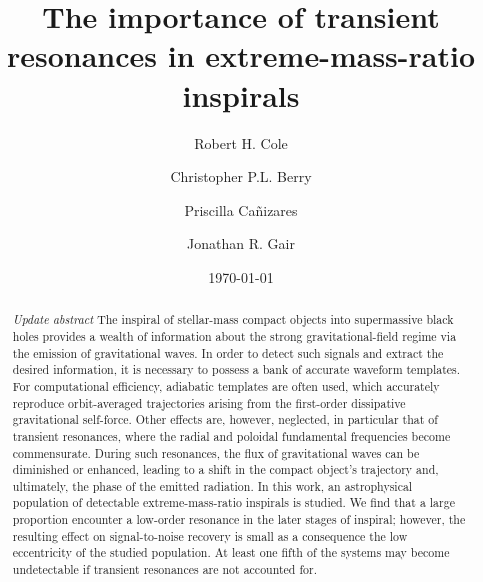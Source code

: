 \documentclass[aps,prd,amsfonts,amssymb,amsmath,nofootinbib,showpacs,superscriptaddress,twocolumn]{revtex4}
\begin{document}

\title{The importance of transient resonances in extreme-mass-ratio inspirals}

\author{Robert H. Cole}
\author{Christopher P.L. Berry}
\author{Priscilla Ca\~{n}izares}
\author{Jonathan R. Gair}

\date{\today}

\begin{abstract}
\emph{Update abstract}
The inspiral of stellar-mass compact objects into supermassive black holes provides a wealth of information about the strong gravitational-field regime via the emission of gravitational waves. In order to detect such signals and extract the desired information, it is necessary to possess a bank of accurate waveform templates. For computational efficiency, adiabatic templates are often used, which accurately reproduce orbit-averaged trajectories arising from the first-order dissipative gravitational self-force. Other effects are, however, neglected, in particular that of transient resonances, where the radial and poloidal fundamental frequencies become commensurate. During such resonances, the flux of gravitational waves can be diminished or enhanced, leading to a shift in the compact object's trajectory and, ultimately, the phase of the emitted radiation. In this work, an astrophysical population of detectable extreme-mass-ratio inspirals is studied. We find that a large proportion encounter a low-order resonance in the later stages of inspiral; however, the resulting effect on signal-to-noise recovery is small as a consequence the low eccentricity of the studied population. At least one fifth of the systems may become undetectable if transient resonances are not accounted for.
\end{abstract}

\end{document}
